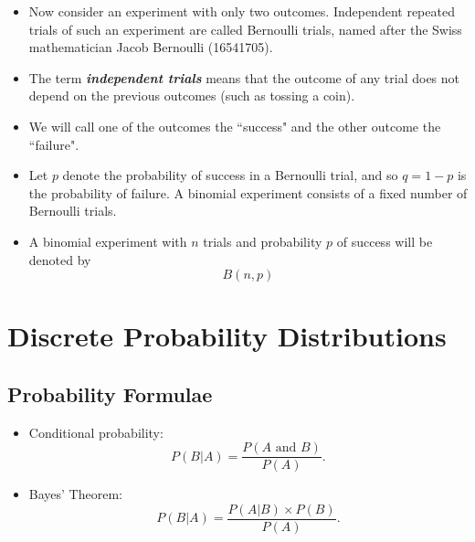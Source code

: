 \documentclass[12pt]{report}
\begin{document}
		
		
		\begin{itemize}
			\item Now consider an experiment with only two outcomes. Independent repeated trials of such an experiment are
			called Bernoulli trials, named after the Swiss mathematician Jacob Bernoulli (16541705). \item The term \textbf{\emph{independent
					trials}} means that the outcome of any trial does not depend on the previous outcomes (such as tossing a coin).
			\item We will call one of the outcomes the ``success" and the other outcome the ``failure".
		\end{itemize}
		
		
		
		\begin{itemize} \item
			Let $p$ denote the probability of success in a Bernoulli trial, and so $q = 1 - p$ is the probability of failure.
			A binomial experiment consists of a fixed number of Bernoulli trials. \item A binomial experiment with $n$ trials and
			probability $p$ of success will be denoted by
			\[B(n, p)\]
		\end{itemize}
		
		\chapter{Discrete Probability Distributions}
\section{Probability Formulae}

\begin{itemize}
	
	\item Conditional probability:
	\begin{equation*}
	P(B|A)=\frac{P\left( A\text{ and }B\right) }{P\left( A\right) }.
	\end{equation*}
	
	
	\item Bayes' Theorem:
	\begin{equation*}
	P(B|A)=\frac{P\left(A|B\right) \times P(B) }{P\left( A\right) }.
	\end{equation*}
\end{itemize}
\end{document}
